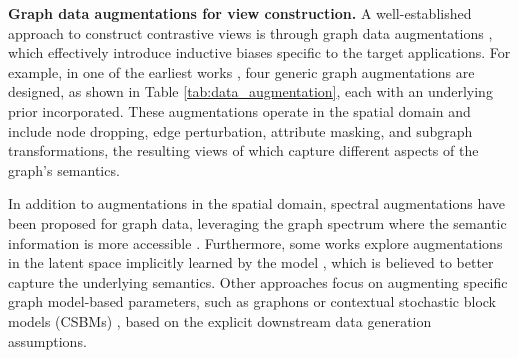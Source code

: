 \documentclass[11pt]{article}
\begin{document}
\begin{table}
 \vspace{-0.5em}
 \caption{Four generic augmentation strategies (in the spatial domain) with the corresponding underlying inductive bias.} \label{tab:data_augmentation}
 \vspace{-0.5em}
 \centering
 \vspace{-0.5em}
\end{table}
\noindent
\textbf{Graph data augmentations for view construction.}
A well-established approach to construct contrastive views is through graph data augmentations \cite{you2020graph, zhu2021graph, ding2022data, zhao2021data, zhou2020data, marrium2022data}, which effectively introduce inductive biases specific to the target applications. For example, in one of the earliest works \cite{you2020graph}, four generic graph augmentations are designed, as shown in Table \ref{tab:data_augmentation}, each with an underlying prior incorporated. These augmentations operate in the spatial domain and include node dropping, edge perturbation, attribute masking, and subgraph transformations, the resulting views of which capture different aspects of the graph's semantics.

In addition to augmentations in the spatial domain, spectral augmentations have been proposed for graph data, leveraging the graph spectrum where the semantic information is more accessible \cite{ghose2023spectral, zhang2022spectral, lin2022spectral}. Furthermore, some works explore augmentations in the latent space implicitly learned by the model \cite{xie2022self2, kong2020flag, verma2021graphmix}, which is believed to better capture the underlying semantics. Other approaches focus on augmenting specific graph model-based parameters, such as graphons \cite{han2022g, ruiz2020graphon} or contextual stochastic block models (CSBMs) \cite{wei2022understanding}, based on the explicit downstream data generation assumptions.
\end{document}
